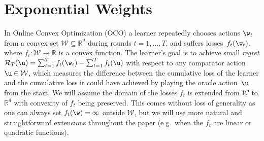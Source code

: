 \documentclass{colt2018} %
\newcommand{\reals}{\mathbb{R}}
\newcommand{\domainw}{\mathcal{W}}
\newcommand{\regret}{\mathcal{R}}
\begin{document}
% 

% 
% 

% 
% 
% 
% 
% 
% 
% 

\section{Exponential Weights}
\label{sec:EW}

In Online Convex Optimization (OCO)
\citep{ShaiBook,hazan2016introduction} a learner repeatedly chooses
actions $\w_t$ from a convex set $\domainw \subseteq \reals^d$ during
rounds $t=1,\ldots,T$, and suffers losses~$f_t(\w_t)$, where $f_t:
\domainw \to \reals$ is a convex function. The learner's 
goal is to achieve small \emph{regret}
% 
% 
  $\regret_T(\u) = \sum_{t=1}^T f_t(\w_t) - \sum_{t=1}^T f_t(\u)$
% 
% 
with respect to any comparator action $\u \in \domainw$,
which measures the difference between the cumulative loss of the learner and
the cumulative loss it could have achieved by playing the oracle
action~$\u$ from the start.
% 
We will assume the domain of the losses $f_t$ is extended from $\domainw$ to
$\reals^d$ with convexity of $f_t$ being preserved. This comes without
loss of generality as one can always set $f_t(\w)=\infty$ outside
$\domainw$, but we will use more natural and straightforward extensions
throughout the paper (e.g.\ when the $f_t$ are linear or quadratic
functions).

% 
% 
% 
% 
% 
% 
% 
% 
% 
% 
% 
% 
% 
% 
% 
% 
% 
% 
% 
% 
% 
% 
% 
% 
% 
% 
% 
% 
% 
% 
% 
\end{document}
